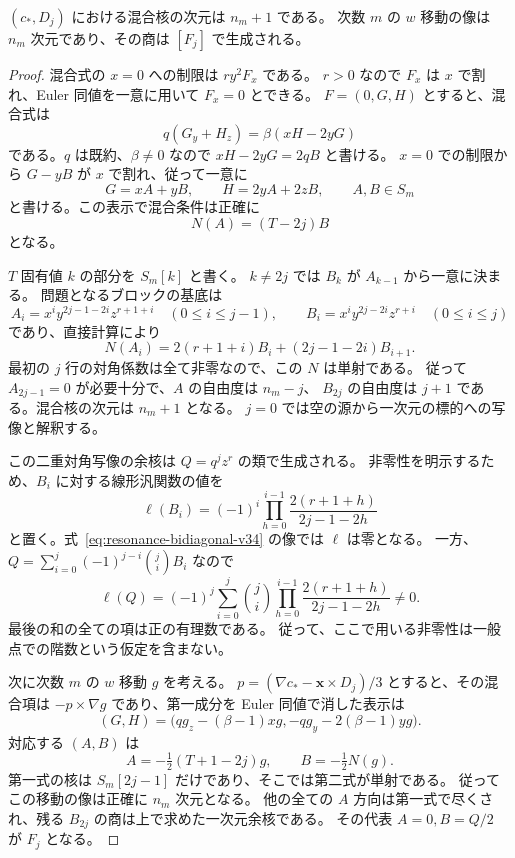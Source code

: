 \begin{lemma}[共鳴混合核]
\label{lem:resonance-kernel-v34}
$(c_*,D_j)$ における混合核の次元は $n_m+1$ である。
次数 $m$ の $w$ 移動の像は $n_m$ 次元であり、その商は $[F_j]$ で生成される。
\end{lemma}

\begin{proof}
混合式の $x=0$ への制限は $r y^2F_x$ である。
$r>0$ なので $F_x$ は $x$ で割れ、Euler 同値を一意に用いて $F_x=0$ とできる。
$F=(0,G,H)$ とすると、混合式は
\[
 q(G_y+H_z)=\beta(xH-2yG)
\]
である。$q$ は既約、$\beta\ne0$ なので $xH-2yG=2qB$ と書ける。
$x=0$ での制限から $G-yB$ が $x$ で割れ、従って一意に
\[
 G=xA+yB,\qquad H=2yA+2zB,\qquad A,B\in S_m
\]
と書ける。この表示で混合条件は正確に
\begin{equation}
 N(A)=(T-2j)B
 \label{eq:resonance-operator-v34}
\end{equation}
となる。

$T$ 固有値 $k$ の部分を $S_m[k]$ と書く。
$k\ne2j$ では $B_k$ が $A_{k-1}$ から一意に決まる。
問題となるブロックの基底は
\[
 A_i=x^iy^{2j-1-2i}z^{r+1+i}\quad(0\leq i\leq j-1),
 \qquad
 B_i=x^iy^{2j-2i}z^{r+i}\quad(0\leq i\leq j)
\]
であり、直接計算により
\begin{equation}
 N(A_i)=2(r+1+i)B_i+(2j-1-2i)B_{i+1}.
 \label{eq:resonance-bidiagonal-v34}
\end{equation}
最初の $j$ 行の対角係数は全て非零なので、この $N$ は単射である。
従って $A_{2j-1}=0$ が必要十分で、$A$ の自由度は $n_m-j$、
$B_{2j}$ の自由度は $j+1$ である。混合核の次元は $n_m+1$ となる。
$j=0$ では空の源から一次元の標的への写像と解釈する。

この二重対角写像の余核は $Q=q^jz^r$ の類で生成される。
非零性を明示するため、$B_i$ に対する線形汎関数の値を
\[
 \ell(B_i)=(-1)^i\prod_{h=0}^{i-1}
       \frac{2(r+1+h)}{2j-1-2h}
\]
と置く。式~\eqref{eq:resonance-bidiagonal-v34} の像では $\ell$ は零となる。
一方、$Q=\sum_{i=0}^j(-1)^{j-i}\binom ji B_i$ なので
\[
 \ell(Q)=(-1)^j\sum_{i=0}^j\binom ji
      \prod_{h=0}^{i-1}\frac{2(r+1+h)}{2j-1-2h}\ne0.
\]
最後の和の全ての項は正の有理数である。
従って、ここで用いる非零性は一般点での階数という仮定を含まない。

次に次数 $m$ の $w$ 移動 $g$ を考える。
$p=(\nabla c_*-\mathbf x\times D_j)/3$ とすると、その混合項は
$-p\times\nabla g$ であり、第一成分を Euler 同値で消した表示は
\[
 (G,H)=\bigl(qg_z-(\beta-1)xg,
             -qg_y-2(\beta-1)yg\bigr).
\]
対応する $(A,B)$ は
\begin{equation}
 A=-\tfrac12(T+1-2j)g,\qquad B=-\tfrac12N(g).
 \label{eq:resonance-hamiltonian-v34}
\end{equation}
第一式の核は $S_m[2j-1]$ だけであり、そこでは第二式が単射である。
従ってこの移動の像は正確に $n_m$ 次元となる。
他の全ての $A$ 方向は第一式で尽くされ、残る $B_{2j}$ の商は上で求めた一次元余核である。
その代表 $A=0,B=Q/2$ が $F_j$ となる。
\end{proof}

